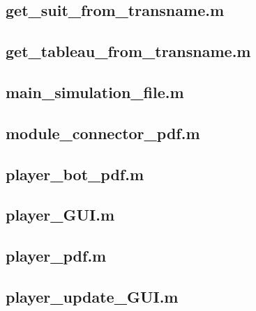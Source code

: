 \documentclass[runningheads,a4paper]{llncs}
\newcommand{\GPenSIM}{../GPenSIM}
\begin{document}
\subsection{get\_suit\_from\_transname.m}
\label{app:get_suit_from_transname}


\subsection{get\_tableau\_from\_transname.m}
\label{app:get_tableau_from_transname}


\subsection{main\_simulation\_file.m}
\label{app:main_simulation_file}


\subsection{module\_connector\_pdf.m}
\label{app:module_connector_pdf}


\subsection{player\_bot\_pdf.m}
\label{app:player_bot_pdf}


\subsection{player\_GUI.m}
\label{app:player_GUI}


\subsection{player\_pdf.m}
\label{app:player_pdf}


\subsection{player\_update\_GUI.m}
\label{app:player_update_GUI}

\end{document}
